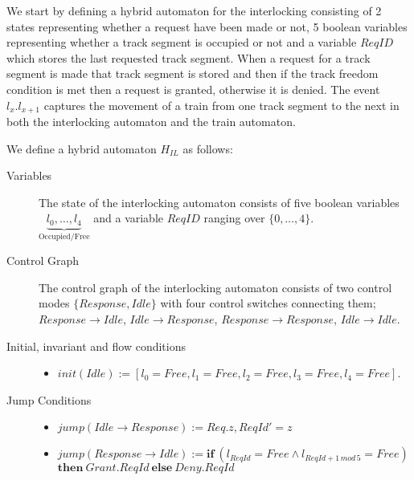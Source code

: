 We start by defining a hybrid automaton for the interlocking consisting of 2 states representing whether a request have been made or not, 5 boolean variables representing whether a track segment is occupied or not and a variable $ReqID$ which stores the last requested track segment. When a request for a track segment is made that track segment is stored and then if the track freedom condition is met then a request is granted, otherwise it is denied. The event $l_x.l_{x+1}$ captures the movement of a train from one track segment to the next in both the interlocking automaton and the train automaton.
\medskip
\begin{mydef}
We define a hybrid automaton $H_{IL}$ as follows:
\begin{description}
\item[Variables] The state of the interlocking automaton consists of five boolean variables  $\underbrace{l_0, \ldots , l_4}_\text{Occupied/Free}$ and a variable $ReqID$ ranging over $\{0 , \ldots , 4 \}$.

\item[Control Graph] The control graph of the interlocking automaton consists of two control modes $\{Response, Idle \}$ with four control switches connecting them; $Response \to Idle$, $Idle \to Response$, $Response \to Response$, $Idle \to Idle$.

\item[Initial, invariant and flow conditions] \hspace*{0mm}
	\begin{itemize}
	\item $init(Idle) := [l_0 = Free, l_1 = Free, l_2 = Free, l_3 = Free, l_4 = Free]$.

	\end{itemize}

\item[Jump Conditions] \hspace*{0mm}

	\begin{itemize}
	\item $jump(Idle \to Response) :=  Req.z , ReqId' = z$

	
	\item $jump(Response \to Idle) := \mathbf{if} \ (l_{ReqId} = Free \wedge l_{ReqId +1 \, mod \, 5} = Free)$ \\
             \hspace{\fill} $\mathbf{then} \ Grant. ReqId \ \mathbf{else} \ Deny.ReqId$ 


\end{itemize}
\end{description}
\end{mydef}
